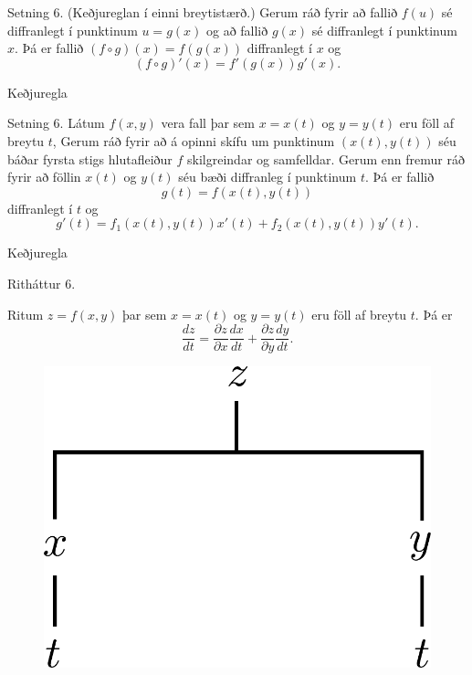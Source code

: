 \date{21.~janúar 2015}



\begin{frame}
	\maketitle
\end{frame}




\begin{frame}{} 

\begin {block}{Setning 6. (Keðjureglan í einni breytistærð.)}
 Gerum ráð fyrir að fallið $f(u)$ sé diffranlegt í punktinum $u=g(x)$ og að fallið $g(x)$ sé diffranlegt í punktinum $x$.  Þá er fallið $(f\circ g)(x)=f(g(x))$ diffranlegt í $x$ og 
$$(f\circ g)'(x)=f'(g(x))g'(x).$$

\end{block}

\end{frame}



\begin{frame}{ Keðjuregla} 

\begin {block}{Setning 6.}
Látum $f(x,y)$ vera fall þar sem $x=x(t)$ og $y=y(t)$ eru föll af breytu $t$,  Gerum ráð fyrir að á opinni skífu um  punktinum $(x(t),y(t))$ séu báðar fyrsta stigs hlutafleiður $f$ skilgreindar og samfelldar.   Gerum enn fremur ráð fyrir að föllin $x(t)$ og $y(t)$ séu bæði diffranleg í punktinum $t$.  Þá er fallið 
$$g(t)=f(x(t),y(t))$$
diffranlegt í $t$ og 
$$g'(t)=f_1(x(t),y(t))x'(t)+f_2(x(t),y(t))y'(t).$$
\end{block}

\end{frame}

\begin{frame}{Keðjuregla} 

\begin {block}{Ritháttur 6.}

Ritum $z=f(x,y)$ þar sem $x=x(t)$ og $y=y(t)$ eru föll af breytu $t$.  Þá er 
$$\frac{dz}{dt}=\frac{\partial z}{\partial x}\frac{dx}{dt}
+\frac{\partial z}{\partial y}\frac{dy}{dt}.$$
\end{block}
 \begin{figure}[h!]
           \centering
            \includegraphics[width=0.3\linewidth]{chain1}
    \end{figure}
\end{frame}

